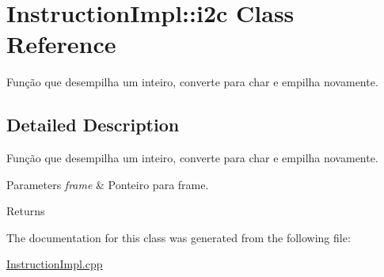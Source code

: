 \hypertarget{class_instruction_impl_1_1i2c}{}\section{Instruction\+Impl\+:\+:i2c Class Reference}
\label{class_instruction_impl_1_1i2c}


Função que desempilha um inteiro, converte para char e empilha novamente.  




\subsection{Detailed Description}
Função que desempilha um inteiro, converte para char e empilha novamente. 


\begin{DoxyParams}{Parameters}
{\em frame} & Ponteiro para frame. \\
\hline
\end{DoxyParams}
\begin{DoxyReturn}{Returns}

\end{DoxyReturn}


The documentation for this class was generated from the following file\+:\begin{DoxyCompactItemize}
\item 
\hyperlink{_instruction_impl_8cpp}{Instruction\+Impl.\+cpp}\end{DoxyCompactItemize}
